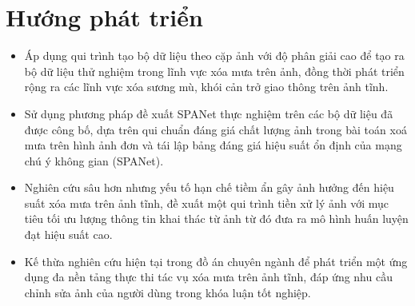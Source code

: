 \section{Hướng phát triển}
\hspace{10mm}{Một số hướng phát triển cho đồ án chuyên ngành này bao gồm:}
\begin{itemize}
    \item Áp dụng qui trình tạo bộ dữ liệu theo cặp ảnh với độ phân giải cao để tạo ra bộ dữ liệu thử nghiệm trong lĩnh vực xóa mưa trên ảnh, đồng thời phát triển rộng ra các lĩnh vực xóa sương mù, khói cản trở giao thông trên ảnh tĩnh.
    \item Sử dụng phương pháp đề xuất SPANet thực nghiệm trên các bộ dữ liệu đã được công bố, dựa trên qui chuẩn đáng giá chất lượng ảnh trong bài toán xoá mưa trên hình ảnh đơn và tái lập bảng đáng giá hiệu suất ổn định của mạng chú ý không gian (SPANet).
    \item Nghiên cứu sâu hơn nhưng yếu tố hạn chế tiềm ẩn gây ảnh hưởng đến hiệu suất xóa mưa trên ảnh tĩnh, đề xuất một qui trình tiền xử lý ảnh với mục tiêu tối ưu lượng thông tin khai thác từ ảnh từ đó đưa ra mô hình huấn luyện đạt hiệu suất cao.
    \item Kế thừa nghiên cứu hiện tại trong đồ án chuyên ngành để phát triển một ứng dụng đa nền tảng thực thi tác vụ xóa mưa trên ảnh tĩnh, đáp ứng nhu cầu chỉnh sửa ảnh của người dùng trong khóa luận tốt nghiệp.
    
\end{itemize}